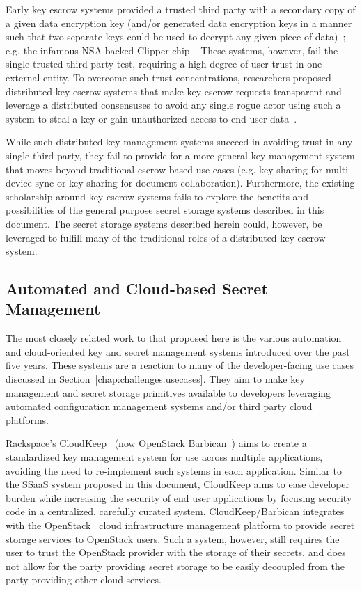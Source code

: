 Early key escrow systems provided a trusted third party with a
secondary copy of a given data encryption key (and/or generated data
encryption keys in a manner such that two separate keys could be used
to decrypt any given piece of data)~\cite{denning1996}; e.g. the
infamous NSA-backed Clipper chip~\cite{whitehouse-clipper}. These
systems, however, fail the single-trusted-third party test, requiring
a high degree of user trust in one external entity. To overcome such
trust concentrations, researchers proposed distributed key escrow
systems that make key escrow requests transparent and leverage a
distributed consensuses to avoid any single rogue actor using such a
system to steal a key or gain unauthorized access to end user
data~\cite{blaze1996}.

While such distributed key management systems succeed in avoiding
trust in any single third party, they fail to provide for a more
general key management system that moves beyond traditional
escrow-based use cases (e.g. key sharing for multi-device sync or key
sharing for document collaboration). Furthermore, the existing
scholarship around key escrow systems fails to explore the benefits
and possibilities of the general purpose secret storage systems
described in this document. The secret storage systems described
herein could, however, be leveraged to fulfill many of the traditional
roles of a distributed key-escrow system.

\subsection{Automated and Cloud-based Secret Management}

The most closely related work to that proposed here is the various
automation and cloud-oriented key and secret management systems
introduced over the past five years. These systems are a reaction to
many of the developer-facing use cases discussed in
Section~\ref{chap:challenges:usecases}. They aim to make key
management and secret storage primitives available to developers
leveraging automated configuration management systems and/or third
party cloud platforms.

Rackspace's CloudKeep~\cite{cloudkeep-presentation, cloudkeep} (now
OpenStack Barbican~\cite{openstack-barbican}) aims to create a
standardized key management system for use across multiple
applications, avoiding the need to re-implement such systems in each
application. Similar to the SSaaS system proposed in this document,
CloudKeep aims to ease developer burden while increasing the security
of end user applications by focusing security code in a centralized,
carefully curated system. CloudKeep/Barbican integrates with the
OpenStack~\cite{openstack} cloud infrastructure management platform to
provide secret storage services to OpenStack users. Such a system,
however, still requires the user to trust the OpenStack provider with
the storage of their secrets, and does not allow for the party
providing secret storage to be easily decoupled from the party
providing other cloud services.

